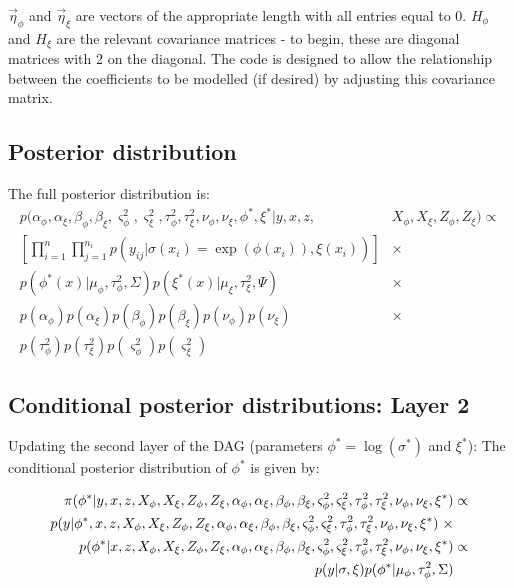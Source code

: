 \documentclass{article}
\begin{document}
$\vec{\eta}_\phi$ and $\vec{\eta}_\xi$ are vectors of the appropriate length with all entries equal to 0. $H_\phi$ and $H_\xi$ are the relevant covariance matrices - to begin, these are diagonal matrices with 2 on the diagonal. The code is designed to allow the relationship between the coefficients to be modelled (if desired) by adjusting this covariance matrix.

\subsection*{Posterior distribution}

The full posterior distribution is:
\begin{align*}
p(\alpha_\phi, \alpha_\xi, \beta_\phi, \beta_\xi, \varsigma^2_\phi, \varsigma^2_\xi, \tau^2_\phi, \tau^2_\xi, \nu_\phi, \nu_\xi, \phi^*, \xi^* | y, x, z, & X_\phi, X_\xi, Z_\phi, Z_\xi) \propto \\
\left[ \prod_{i=1}^n \prod_{j=1}^{n_i} p(y_{ij} | \sigma(x_i)=\exp(\phi(x_i)), \xi(x_i)) \right] & \times \\
p(\phi^*(x) | \mu_\phi, \tau^2_\phi, \Sigma) p(\xi^*(x) | \mu_\xi, \tau^2_\xi, \Psi) & \times \\
p(\alpha_\phi) p(\alpha_\xi) p(\beta_\phi) p(\beta_\xi) p(\nu_\phi) p(\nu_\xi) & \times \\
p(\tau^2_\phi) p(\tau^2_\xi) p(\varsigma^2_\phi) p(\varsigma^2_\xi) &
\end{align*}

\subsection*{Conditional posterior distributions: Layer 2}

Updating the second layer of the DAG (parameters $\phi^* = \log(\sigma^*)$ and $\xi^*$): The conditional posterior distribution of $\phi^*$ is given by:

\begin{align*}
\pi(\phi^* | y, x, z, X_\phi, X_\xi, Z_\phi, Z_\xi, \alpha_\phi, \alpha_\xi, \beta_\phi, \beta_\xi, \varsigma^2_\phi, \varsigma^2_\xi, \tau^2_\phi, \tau^2_\xi, \nu_\phi, \nu_\xi, \xi^*) & \propto \\
\vspace{5 pt}
p(y | \phi^*, x, z, X_\phi, X_\xi, Z_\phi, Z_\xi, \alpha_\phi, \alpha_\xi, \beta_\phi, \beta_\xi, \varsigma^2_\phi, \varsigma^2_\xi, \tau^2_\phi, \tau^2_\xi, \nu_\phi, \nu_\xi, \xi^*) \hspace{3 pt} \times & \\
p(\phi^* | x, z, X_\phi, X_\xi, Z_\phi, Z_\xi, \alpha_\phi, \alpha_\xi, \beta_\phi, \beta_\xi, \varsigma^2_\phi, \varsigma^2_\xi, \tau^2_\phi, \tau^2_\xi, \nu_\phi, \nu_\xi, \xi^*) & \propto \\
p(y | \sigma, \xi)  p(\phi^* | \mu_\phi, \tau^2_\phi, \Sigma) &
\end{align*}
\end{document}
